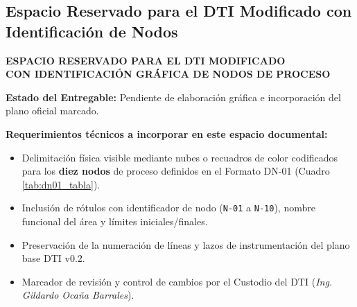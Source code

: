 \documentclass[10pt,letterpaper]{article}
\begin{document}
\begin{landscape}
\thispagestyle{fancy}
\subsection{Espacio Reservado para el DTI Modificado con Identificación de Nodos}
\begin{tcolorbox}[colframe=navyblue,colback=boxbg,arc=4mm,boxrule=1.5pt,height=0.82\textheight,valign=center]
    \centering
    {\huge \textbf{\color{navyblue} ESPACIO RESERVADO PARA EL DTI MODIFICADO}}\\[0.25cm]
    {\LARGE \textbf{\color{accentblue} CON IDENTIFICACIÓN GRÁFICA DE NODOS DE PROCESO}}\\[0.5cm]
    \begin{tcolorbox}[colframe=darkred,colback=white,arc=2mm,boxrule=1pt,width=0.75\linewidth]
        \centering\large
        \textbf{\color{darkred} Estado del Entregable:} Pendiente de elaboración gráfica e incorporación del plano oficial marcado.
    \end{tcolorbox}
    \vspace{0.6cm}
    \begin{minipage}{0.85\linewidth}
        \small
        \textbf{Requerimientos técnicos a incorporar en este espacio documental:}
        \begin{itemize}
            \item Delimitación física visible mediante nubes o recuadros de color codificados para los \textbf{diez nodos} de proceso definidos en el Formato DN-01 (Cuadro \ref{tab:dn01_tabla}).
            \item Inclusión de rótulos con identificador de nodo (\texttt{N-01} a \texttt{N-10}), nombre funcional del área y límites iniciales/finales.
            \item Preservación de la numeración de líneas y lazos de instrumentación del plano base DTI v0.2.
            \item Marcador de revisión y control de cambios por el Custodio del DTI (\textit{Ing. Gildardo Ocaña Barrales}).
        \end{itemize}
    \end{minipage}
\end{tcolorbox}
\end{landscape}
\end{document}

